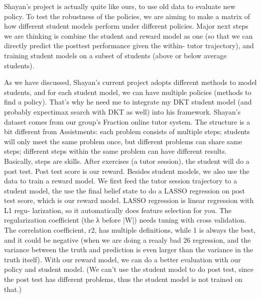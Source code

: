

Shayan’s project is actually quite like ours, to use old data to evaluate new policy. To test the robustness of the policies, we are aiming to make a matrix of how different student models perform under different policies. Major next steps we are thinking is combine the student and reward model as one (so that we can directly predict the posttest performance given the within- tutor trajectory), and training student models on a subset of students (above or below average students).


As we have discussed, Shayan’s current project adopts different methods to model students, and for each student model, we can have multiple policies (methods to find a policy). That’s why he need me to integrate my DKT student model (and probably expectimax search with DKT as well) into his framework.
Shayan’s dataset comes from our group’s Fraction online tutor system. The structure is a bit different from Assistments: each problem consists of multiple steps; students will only meet the same problem once, but different problems can share same steps; different steps within the same problem can have different results. Basically, steps are skills. After exercises (a tutor session), the student will do a post test. Post test score is our reward.
Besides student models, we also use the data to train a reward model. We first feed the tutor session trajectory to a student model, the use the final belief state to do a LASSO regression on post test score, which is our reward model. LASSO regression is linear regression with L1 regu- larization, so it automatically does feature selection for you. The regularization coefficient (the λ before |W|) needs tuning with cross validation. The correlation coefficient, r2, has multiple definitions, while 1 is always the best, and it could be negative (when we are doing a reaaly bad
26
regression, and the variance between the truth and prediction is even larger than the variance in the truth itself).
With our reward model, we can do a better evaluation with our policy and student model. (We can’t use the student model to do post test, since the post test has different problems, thus the student model is not trained on that.)


